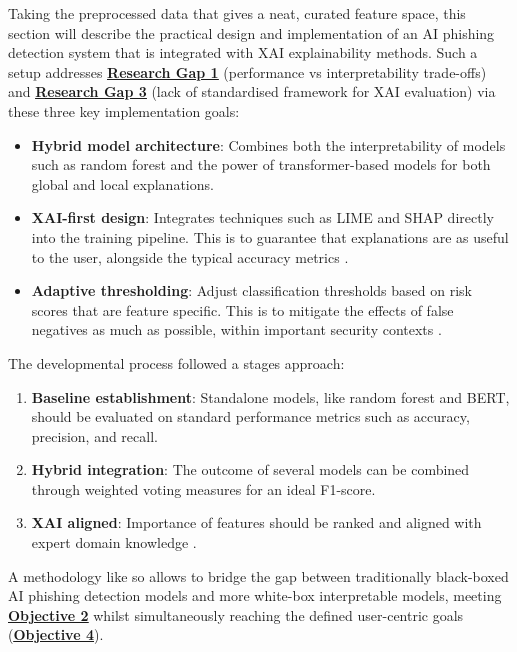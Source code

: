 
Taking the preprocessed data that gives a neat, curated feature space, this section will describe the practical design and implementation of an AI phishing detection system that is integrated with XAI explainability methods. Such a setup addresses \hyperref[research-gap-1]{\uline{\textbf{Research Gap 1}}} (performance vs interpretability trade-offs) and \hyperref[research-gap-3]{\uline{\textbf{Research Gap 3}}} (lack of standardised framework for XAI evaluation) via these three key implementation goals:

\begin{itemize}
  \item \textbf{Hybrid model architecture}: Combines both the interpretability of models such as random forest and the power of transformer-based models \citep{shirazi2022towards} for both global and local explanations.
  \item \textbf{XAI-first design}: Integrates techniques such as LIME and SHAP directly into the training pipeline. This is to guarantee that explanations are as useful to the user, alongside the typical accuracy metrics \citep{shendkar2024enhancing}.
  \item \textbf{Adaptive thresholding}: Adjust classification thresholds based on risk scores that are feature specific. This is to mitigate the effects of false negatives as much as possible, within important security contexts \citep{atlam2022business}.
\end{itemize}

\noindent The developmental process followed a stages approach:

\begin{enumerate}
  \item \textbf{Baseline establishment}: Standalone models, like random forest and BERT, should be evaluated on standard performance metrics such as accuracy, precision, and recall.
  \item \textbf{Hybrid integration}: The outcome of several models can be combined through weighted voting measures for an ideal F1-score.
  \item \textbf{XAI aligned}: Importance of features should be ranked and aligned with expert domain knowledge \citep{greco2023explaining}.
\end{enumerate}

\noindent A methodology like so allows to bridge the gap between traditionally black-boxed AI phishing detection models and more white-box interpretable models, meeting \hyperref[objective-2]{\uline{\textbf{Objective 2}}} whilst simultaneously reaching the defined user-centric goals (\hyperref[objective-4]{\uline{\textbf{Objective 4}}}).
